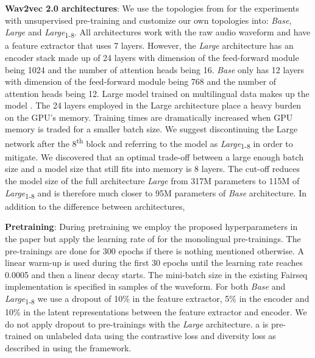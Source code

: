 \textbf{Wav2vec 2.0 architectures}: We use the topologies from  for the experiments with unsupervised pre-training \cite{wav2vec2} and customize our own topologies into:
\textit{Base}, \textit{Large} and \textit{Large}\textsubscript{1-8}.
All architectures work with the raw audio waveform and have a feature extractor that uses 7  layers. 
However, the \textit{Large} architecture has an encoder stack made up of 24  layers with dimension of the feed-forward module being 1024 and the number of attention heads being 16. 
\textit{Base} only has 12  layers with dimension of the feed-forward module being 768 and the number of attention heads being 12.
 Large model trained on multilingual data makes up the  model \cite{xlsr53}. 
The 24  layers employed in the Large architecture place a heavy burden on the GPU's memory. 
Training times are dramatically increased when GPU memory is traded for a smaller batch size. 
We suggest discontinuing the  Large network after the 
8\textsuperscript{th}  block and referring to the model as
\textit{Large}\textsubscript{1-8}\xspace 
in order to mitigate.
We discovered that an optimal trade-off between a large enough batch size and a model size that still fits into memory is 8 layers.
The cut-off reduces the model size of the full
architecture \textit{Large} from 317M parameters to 115M of \textit{Large}\textsubscript{1-8}\xspace and is
therefore much closer to 95M parameters of \textit{Base} architecture.
In addition to the difference between architectures, 

\textbf{Pretraining}: During pretraining we employ the proposed hyperparameters in the  paper \cite{xlsr53} but apply the learning rate of  for the monolingual pre-trainings.
The pre-trainings are done for 300 epochs if there is nothing mentioned otherwise.
A linear warm-up is used during the first 30 epochs until the learning rate reaches 0.0005 and then a linear decay starts.
The mini-batch size in the existing Fairseq implementation is specified in samples of the waveform.
For both \textit{Base} and \textit{Large}\textsubscript{1-8} we use a dropout of 10\% in the feature extractor, 
5\% in the encoder and 10\% in the latent representations between the feature extractor and encoder.
We do not apply dropout to pre-trainings with the \textit{Large} architecture.
a  is pre-trained on unlabeled data using the contrastive loss and diversity loss as described in \cite{wav2vec2} using the  framework.

